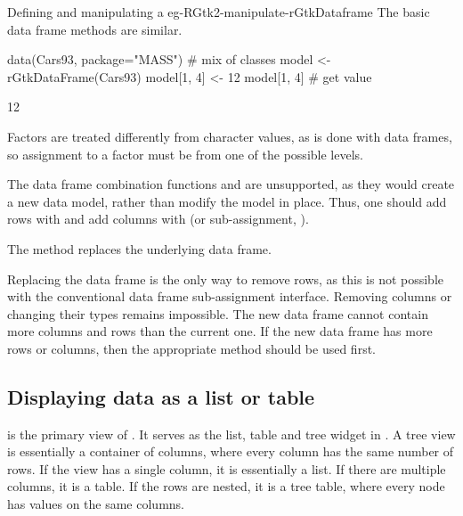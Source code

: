 \begin{example}{Defining and manipulating a }{eg-RGtk2-manipulate-rGtkDataframe}
  The basic data frame methods are similar.
\begin{Schunk}
\begin{Sinput}
 data(Cars93, package="MASS")            # mix of classes
 model <- rGtkDataFrame(Cars93)
 model[1, 4] <- 12
 model[1, 4]                              # get value
\end{Sinput}
\begin{Soutput}
[1] 12
\end{Soutput}
\end{Schunk}

Factors are treated differently from character values, as is done with
data frames, so assignment to a factor must be from one of the
possible levels.

\end{example}

The data frame combination functions  and
 are unsupported, as they would create a new data
model, rather than modify the model in place. Thus, one should add
rows with  and add columns with
 (or sub-assignment, 
\method{[\ASSIGN}{RGtkDataFrame}).

The  method replaces the underlying
data frame.
\begin{Schunk}
\end{Schunk}
%
Replacing the data frame is the only way to remove rows, as this is
not possible with the conventional data frame sub-assignment
interface. Removing columns or changing their types remains
impossible. The new data frame cannot contain more columns and rows
than the current one. If the new data frame has more rows or columns,
then the appropriate  method should be used first.

\subsection{Displaying data as a list or table}
\label{sec:RGtk2:mvc:GtkTreeView}

 is the primary view of .  It
serves as the list, table and tree widget in \GTK. A tree view is
essentially a container of columns, where every column has the same
number of rows. If the view has a single column, it is essentially a
list. If there are multiple columns, it is a table. If the rows are
nested, it is a tree table, where every node has values on the same
columns.

